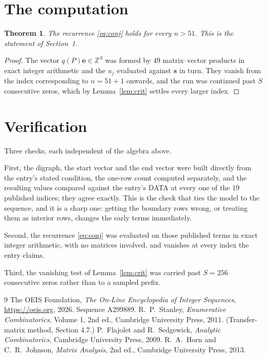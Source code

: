 \documentclass[11pt,a4paper]{article}
\theoremstyle{plain}
\newtheorem{theorem}{Theorem}
\theoremstyle{definition}
\begin{document}
\section{The computation}

\begin{theorem}
The recurrence \eqref{eq:conj} holds for every $n>51$. This is the statement of
Section~1.
\end{theorem}

\begin{proof}
The vector $q(P)\mathbf{e}\in\mathbb{Z}^{S}$ was formed by $49$ matrix--vector
products in exact integer arithmetic and the $u_j$ evaluated against $\mathbf{s}$ in turn.
They vanish from the index corresponding to $n=51+1$ onwards, and the run was continued
past $S$ consecutive zeros, which by Lemma~\ref{lem:crit} settles every larger index.
\end{proof}

\section{Verification}

Three checks, each independent of the algebra above.

First, the digraph, the start vector and the end vector were built directly from the
entry's stated condition, the one-row count computed separately, and the resulting values
compared against the entry's DATA at every one of the $19$ published indices; they
agree exactly. This is the check that ties the model to the sequence, and it is a sharp one:
getting the boundary rows wrong, or treating them as interior rows, changes the early terms
immediately.

Second, the recurrence \eqref{eq:conj} was evaluated on those published terms in exact
integer arithmetic, with no matrices involved, and vanishes at every index the entry claims.

Third, the vanishing test of Lemma~\ref{lem:crit} was carried past $S=256$ consecutive
zeros rather than to a sampled prefix.

\begin{thebibliography}{9}
 The OEIS Foundation, \emph{The On-Line Encyclopedia of Integer
Sequences}, \url{https://oeis.org}, 2026. Sequence A299889.
 R.~P.~Stanley, \emph{Enumerative Combinatorics}, Volume 1, 2nd ed.,
Cambridge University Press, 2011. (Transfer-matrix method, Section 4.7.)
 P.~Flajolet and R.~Sedgewick, \emph{Analytic Combinatorics}, Cambridge
University Press, 2009.
 R.~A.~Horn and C.~R.~Johnson, \emph{Matrix Analysis}, 2nd ed., Cambridge
University Press, 2013.
\end{thebibliography}
\end{document}
